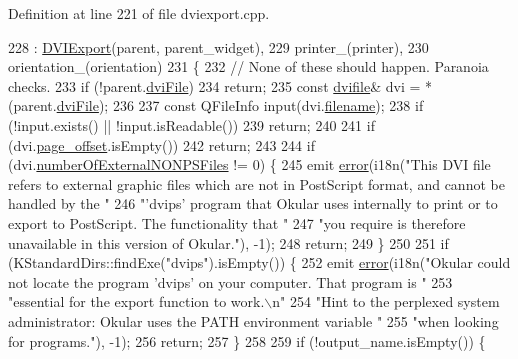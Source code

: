 Definition at line 221 of file dviexport.\+cpp.


\begin{DoxyCode}
228   : \hyperlink{classDVIExport_a126208c08ed676e76ca5442da3c6ae79}{DVIExport}(parent, parent\_widget),
229     printer\_(printer),
230     orientation\_(orientation)
231 \{
232   \textcolor{comment}{// None of these should happen. Paranoia checks.}
233   \textcolor{keywordflow}{if} (!parent.\hyperlink{classdviRenderer_a67ded13a1a8da343aa0ee921ed96d4c2}{dviFile})
234     \textcolor{keywordflow}{return};
235   \textcolor{keyword}{const} \hyperlink{classdvifile}{dvifile}& dvi = *(parent.\hyperlink{classdviRenderer_a67ded13a1a8da343aa0ee921ed96d4c2}{dviFile});
236 
237   \textcolor{keyword}{const} QFileInfo input(dvi.\hyperlink{classdvifile_a1c0fe420231e71f256b5db367b7e1178}{filename});
238   \textcolor{keywordflow}{if} (!input.exists() || !input.isReadable())
239     \textcolor{keywordflow}{return};
240 
241   \textcolor{keywordflow}{if} (dvi.\hyperlink{classdvifile_aeafc97277647ad5077a774be71b3253a}{page\_offset}.isEmpty())
242     \textcolor{keywordflow}{return};
243 
244   \textcolor{keywordflow}{if} (dvi.\hyperlink{classdvifile_a341ffd0f617655a308d5d86fbb085400}{numberOfExternalNONPSFiles} != 0) \{
245     emit \hyperlink{classDVIExport_af4dc2cb358975a05b15c145fbe8d4e8f}{error}(i18n(\textcolor{stringliteral}{"This DVI file refers to external graphic files which are not in PostScript
       format, and cannot be handled by the "}
246                     \textcolor{stringliteral}{"'dvips' program that Okular uses internally to print or to export to PostScript. The
       functionality that "}
247                     \textcolor{stringliteral}{"you require is therefore unavailable in this version of Okular."}), -1);
248     \textcolor{keywordflow}{return};
249   \}
250 
251   \textcolor{keywordflow}{if} (KStandardDirs::findExe(\textcolor{stringliteral}{"dvips"}).isEmpty()) \{
252     emit \hyperlink{classDVIExport_af4dc2cb358975a05b15c145fbe8d4e8f}{error}(i18n(\textcolor{stringliteral}{"Okular could not locate the program 'dvips' on your computer. That program is "}
253                     \textcolor{stringliteral}{"essential for the export function to work.\(\backslash\)n"}
254                     \textcolor{stringliteral}{"Hint to the perplexed system administrator: Okular uses the PATH environment variable 
      "}
255                     \textcolor{stringliteral}{"when looking for programs."}), -1);
256     \textcolor{keywordflow}{return};
257   \}
258 
259   \textcolor{keywordflow}{if} (!output\_name.isEmpty()) \{

\end{DoxyCode}
